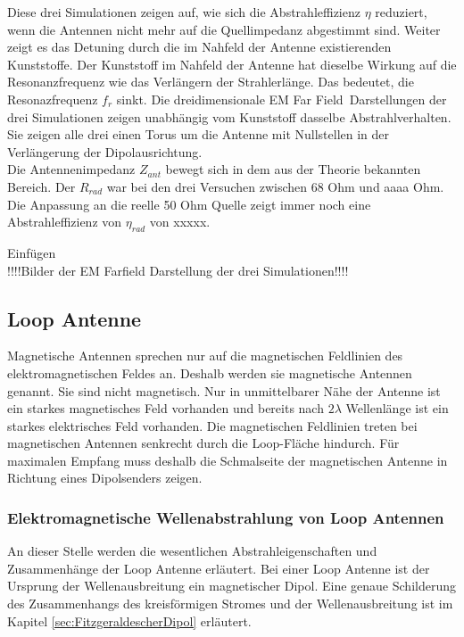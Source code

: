 Diese drei Simulationen zeigen auf, wie sich die Abstrahleffizienz $\eta$ reduziert, wenn die Antennen nicht mehr auf die Quellimpedanz abgestimmt sind. Weiter zeigt es das Detuning durch die im Nahfeld der Antenne existierenden Kunststoffe. Der Kunststoff im Nahfeld der Antenne hat dieselbe Wirkung auf die Resonanzfrequenz wie das Verlängern der  Strahlerlänge. Das bedeutet, die Resonazfrequenz $f_{r}$ sinkt.
Die dreidimensionale \glqq EM Far Field\grqq \  Darstellungen der drei Simulationen zeigen unabhängig vom Kunststoff dasselbe Abstrahlverhalten. Sie zeigen alle drei einen Torus um die Antenne mit Nullstellen in der Verlängerung der Dipolausrichtung.\\
Die Antennenimpedanz $Z_{ant}$ bewegt sich in dem aus der Theorie bekannten Bereich. Der $R_{rad}$ war bei den drei Versuchen zwischen 68 Ohm und  aaaa Ohm. Die Anpassung an die reelle 50 Ohm Quelle zeigt immer noch eine Abstrahleffizienz von $\eta_{rad}$ von   xxxxx.



Einfügen\\
!!!!Bilder der EM Farfield Darstellung der drei Simulationen!!!!



\subsection{Loop Antenne}
Magnetische Antennen sprechen nur auf die magnetischen Feldlinien des elektromagnetischen Feldes an. Deshalb werden sie magnetische Antennen genannt. Sie sind nicht magnetisch. Nur in unmittelbarer Nähe der Antenne ist ein starkes magnetisches Feld vorhanden und bereits nach $2\lambda$ Wellenlänge ist ein starkes elektrisches Feld vorhanden. Die magnetischen Feldlinien treten bei magnetischen Antennen senkrecht durch die Loop-Fläche hindurch. Für maximalen Empfang muss deshalb die Schmalseite der magnetischen Antenne in Richtung eines Dipolsenders  zeigen.

\subsubsection{Elektromagnetische Wellenabstrahlung von Loop Antennen}
An dieser Stelle werden die wesentlichen Abstrahleigenschaften und Zusammenhänge  der Loop Antenne erläutert.
Bei einer Loop Antenne ist der Ursprung der Wellenausbreitung ein magnetischer Dipol. Eine genaue Schilderung des Zusammenhangs des kreisförmigen Stromes und der Wellenausbreitung ist im Kapitel \ref{sec:FitzgeraldescherDipol} erläutert. 

